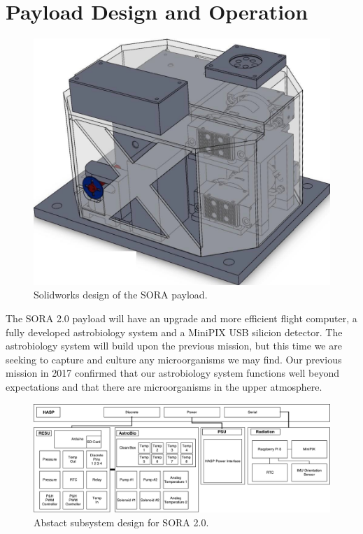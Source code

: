 \section{Payload Design and Operation}
\label{sec:Hardware}

\begin{figure}[!ht]
\begin{center}
\includegraphics[width=.75\textwidth]{./Figures/payload_1.jpg}
\caption{Solidworks design of the SORA payload.}
\label{fig:payload} 
\end{center}
\end{figure}

The SORA 2.0 payload will have an upgrade and more efficient flight computer, a fully developed astrobiology system and a MiniPIX USB silicion detector.  The astrobiology system will build upon the previous mission, but this time we are seeking to capture and culture any microorganisms we may find.  Our previous mission in 2017 confirmed that our astrobiology system functions well beyond expectations and that there are microorganisms in the upper atmosphere.

\begin{figure}[!ht]
\begin{center}
\includegraphics[width=.75\textwidth]{./Figures/RESU_2018.pdf}
\caption{Abstact subsystem design for SORA 2.0.}
\label{fig:payload} 
\end{center}
\end{figure}
